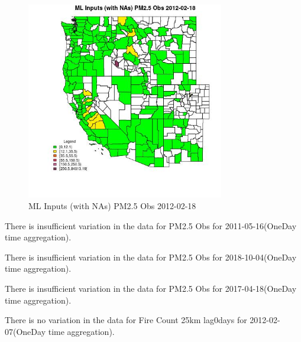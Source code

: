 \begin{figure} 
\centering  
\includegraphics[width=0.77\textwidth]{Code_Outputs/Report_ML_input_PM25_Step4_part_f_de_duplicated_aves_prioritize_24hr_obswNAs_CountyPM25_ObsMean2012-02-18.jpg} 
\caption{\label{fig:Report_ML_input_PM25_Step4_part_f_de_duplicated_aves_prioritize_24hr_obswNAsCountyPM25_ObsMean2012-02-18}ML Inputs (with NAs) PM2.5 Obs 2012-02-18} 
\end{figure} 
 

There is insufficient variation in the data for PM2.5 Obs for 2011-05-16(OneDay time aggregation). 
 

There is insufficient variation in the data for PM2.5 Obs for 2018-10-04(OneDay time aggregation). 
 

There is insufficient variation in the data for PM2.5 Obs for 2017-04-18(OneDay time aggregation). 
 

There is no variation in the data for Fire Count 25km lag0days for 2012-02-07(OneDay time aggregation). 
 

